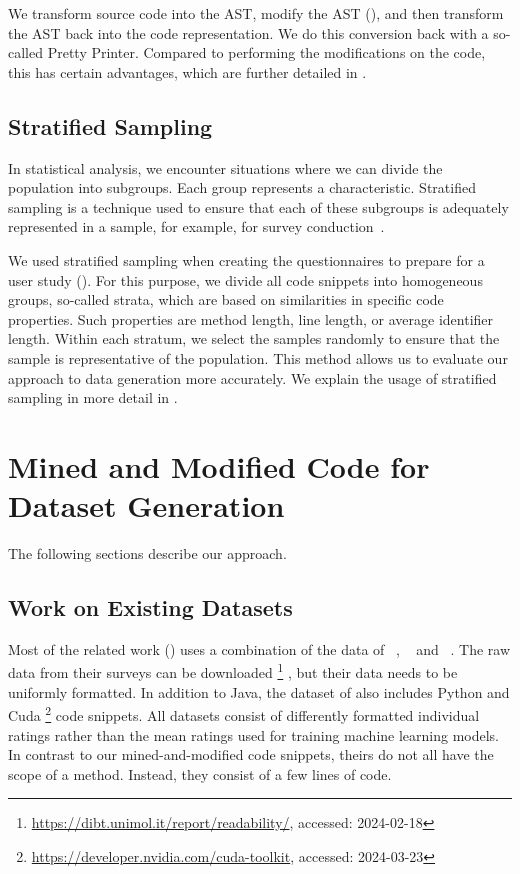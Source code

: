 \documentclass[%
class=scrreprt,
chapterprefix=false,%
open=right,%
twoside=true,%
paper=a4,%
logofile={Logo\_zentral\_farbig\_EN.png},%
thesistype=master,%
UKenglish,%
]{se2thesis}
\newcounter{urlfootnote}
\newcommand{\onecurl}[2]{%
	\stepcounter{urlfootnote}%
	\expandafter\def\csname urlfootnote:#1\endcsname{\theurlfootnote}%
	\footnote{\label{url:#1}\url{#1}, accessed: #2}%
}
\newcommand{\curl}[2]{%
		\onecurl{#1}{#2}%
}
\theoremstyle{definition}
\begin{document}
	We transform source code into the AST, modify the AST (), and then transform the AST back into the code representation. We do this conversion back with a so-called Pretty Printer. Compared to performing the modifications on the code, this has certain advantages, which are further detailed in .
	
\section{Stratified Sampling} \label{Stratified Sampling}	
	In statistical analysis, we encounter situations where we can divide the population into subgroups. Each group represents a characteristic. Stratified sampling is a technique used to ensure that each of these subgroups is adequately represented in a sample, for example, for survey conduction~\cite{thompson2012sampling}.
	
	We used stratified sampling when creating the questionnaires to prepare for a user study (). For this purpose, we divide all code snippets into homogeneous groups, so-called strata, which are based on similarities in specific code properties. Such properties are method length, line length, or average identifier length. Within each stratum, we select the samples randomly to ensure that the sample is representative of the population. This method allows us to evaluate our approach to data generation more accurately. We explain the usage of stratified sampling in more detail in .
	
\chapter{Mined and Modified Code for Dataset Generation} \label{Mined and Modified Code for Dataset Generation}
	The following sections describe our approach.
		
\section{Work on Existing Datasets} \label{Work on Existing Datasets}
	Most of the related work () uses a combination of the data of \citeauthor{buse2009learning}~\cite{buse2009learning}, \citeauthor{dorn2012general}~\cite{dorn2012general} and \citeauthor{scalabrino2018comprehensive}~\cite{scalabrino2018comprehensive}. The raw data from their surveys can be downloaded\curl{https://dibt.unimol.it/report/readability/}{2024-02-18}, but their data needs to be uniformly formatted. In addition to Java, the dataset of \citeauthor{dorn2012general} also includes Python and Cuda\curl{https://developer.nvidia.com/cuda-toolkit}{2024-03-23} code snippets. All datasets consist of differently formatted individual ratings rather than the mean ratings used for training machine learning models. In contrast to our mined-and-modified code snippets, theirs do not all have the scope of a method. Instead, they consist of a few lines of code.
    
\end{document}
